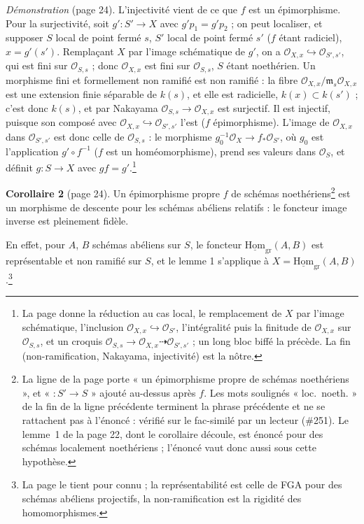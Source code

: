 \documentclass[11pt,a4paper]{article}
\begin{document}
\emph{Démonstration} (page 24). L'injectivité vient de ce que $f$ est un
épimorphisme. Pour la surjectivité, soit $g' : S' \to X$ avec
$g' p_1 = g' p_2$ ; on peut localiser, et supposer $S$ local de point fermé
$s$, $S'$ local de point fermé $s'$ ($f$ étant radiciel), $x = g'(s')$.
Remplaçant $X$ par l'image schématique de $g'$, on a
$\mathcal{O}_{X,x} \hookrightarrow \mathcal{O}_{S',s'}$, qui est fini sur
$\mathcal{O}_{S,s}$ ; donc $\mathcal{O}_{X,x}$ est fini sur
$\mathcal{O}_{S,s}$, $S$ étant noethérien. Un morphisme fini et formellement
non ramifié est non ramifié : la fibre $\mathcal{O}_{X,x}/\mathfrak{m}_s
\mathcal{O}_{X,x}$ est une extension finie séparable de $k(s)$, et elle est
radicielle, $k(x) \subset k(s')$ ; c'est donc $k(s)$, et par Nakayama
$\mathcal{O}_{S,s} \to \mathcal{O}_{X,x}$ est surjectif. Il est injectif,
puisque son composé avec $\mathcal{O}_{X,x} \hookrightarrow
\mathcal{O}_{S',s'}$ l'est ($f$ épimorphisme). L'image de
$\mathcal{O}_{X,x}$ dans $\mathcal{O}_{S',s'}$ est donc celle de
$\mathcal{O}_{S,s}$ : le morphisme $g_0^{-1}\mathcal{O}_X \to
f_*\mathcal{O}_{S'}$, où $g_0$ est l'application $g' \circ f^{-1}$ ($f$ est
un homéomorphisme), prend ses valeurs dans $\mathcal{O}_S$, et définit
$g : S \to X$ avec $g f = g'$.\footnote{La page
donne la réduction au cas local, le remplacement de $X$ par l'image
schématique, l'inclusion $\mathcal{O}_{X,x} \hookrightarrow
\mathcal{O}_{S'}$, l'intégralité puis la finitude de $\mathcal{O}_{X,x}$ sur
$\mathcal{O}_{S,s}$, et un croquis $\mathcal{O}_{S,s} \to \mathcal{O}_{X,x}
\dashrightarrow \mathcal{O}_{S',s'}$ ; un long bloc biffé la précède. La fin
(non-ramification, Nakayama, injectivité) est la nôtre.}

\textbf{Corollaire 2} (page 24). Un épimorphisme propre $f$ de schémas
noethériens\footnote{La ligne de la page porte « un épimorphisme propre de
schémas noethériens », et « $: S' \to S$ » ajouté au-dessus après $f$. Les mots
soulignés « loc.\ noeth. » de la fin de la ligne précédente terminent la phrase
précédente et ne se rattachent pas à l'énoncé : vérifié sur le fac-similé par un
lecteur (\#251). Le lemme~1 de la page 22, dont le corollaire découle, est énoncé
pour des schémas localement noethériens ; l'énoncé vaut donc aussi sous cette
hypothèse.} est un morphisme de descente pour les schémas abéliens
relatifs : le foncteur image inverse est pleinement fidèle.

En effet, pour $A$, $B$ schémas abéliens sur $S$, le foncteur
$\underline{\mathrm{Hom}}_{\mathrm{gr}}(A, B)$ est représentable et non
ramifié sur $S$, et le lemme 1 s'applique à $X = \underline{\mathrm{Hom}}_
{\mathrm{gr}}(A,B)$.\footnote{La page le tient pour connu ; la
représentabilité est celle de FGA pour des schémas abéliens projectifs, la
non-ramification est la rigidité des homomorphismes.}
\end{document}
